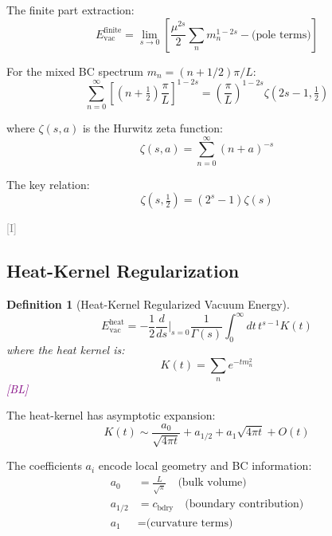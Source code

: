 \documentclass[11pt,a4paper]{article}
\newtheorem{definition}[theorem]{Definition}
\newcommand{\tagI}{\textcolor{gray}{[I]}}
\newcommand{\tagBL}{\textcolor{purple}{[BL]}}
\begin{document}
The finite part extraction:
\begin{equation}
\label{eq:finite-extract}
E_{\text{vac}}^{\text{finite}} = \lim_{s \to 0} \left[\frac{\mu^{2s}}{2} \sum_n m_n^{1-2s}
- \text{(pole terms)}\right]
\end{equation}

For the mixed BC spectrum $m_n = (n + 1/2)\pi/L$:
\begin{equation}
\label{eq:zeta-ND-explicit}
\sum_{n=0}^\infty \left[(n + \tfrac{1}{2})\frac{\pi}{L}\right]^{1-2s} =
\left(\frac{\pi}{L}\right)^{1-2s} \zeta(2s-1, \tfrac{1}{2})
\end{equation}

where $\zeta(s, a)$ is the Hurwitz zeta function:
\begin{equation}
\label{eq:hurwitz-def}
\zeta(s, a) = \sum_{n=0}^\infty (n + a)^{-s}
\end{equation}

The key relation:
\begin{equation}
\label{eq:hurwitz-relation}
\zeta(s, \tfrac{1}{2}) = (2^s - 1) \zeta(s)
\end{equation}

\tagI

\subsection{Heat-Kernel Regularization}

\begin{definition}[Heat-Kernel Regularized Vacuum Energy]
\label{def:heat-reg}
\begin{equation}
\label{eq:heat-vac}
E_{\text{vac}}^{\text{heat}} = -\frac{1}{2} \frac{d}{ds}\bigg|_{s=0}
\frac{1}{\Gamma(s)} \int_0^\infty dt\, t^{s-1} K(t)
\end{equation}
where the heat kernel is:
\begin{equation}
\label{eq:heat-kernel}
K(t) = \sum_n e^{-t m_n^2}
\end{equation}
\tagBL
\end{definition}

The heat-kernel has asymptotic expansion:
\begin{equation}
\label{eq:heat-asymp}
K(t) \sim \frac{a_0}{\sqrt{4\pi t}} + a_{1/2} + a_1 \sqrt{4\pi t} + O(t)
\end{equation}

The coefficients $a_i$ encode local geometry and BC information:
\begin{align}
\label{eq:a0-coeff}
a_0 &= \frac{L}{\sqrt{\pi}} \quad \text{(bulk volume)} \\
\label{eq:a12-coeff}
a_{1/2} &= c_{\text{bdry}} \quad \text{(boundary contribution)} \\
\label{eq:a1-coeff}
a_1 &= \text{(curvature terms)}
\end{align}
\end{document}
